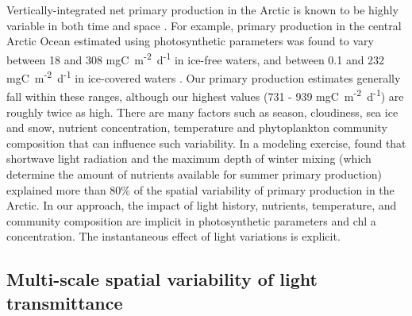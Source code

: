 \documentclass[draft]{agujournal2018}
\newcommand{\dailypp}{mgC~m\textsuperscript{-2}~d\textsuperscript{-1}}
\begin{document}
Vertically-integrated net primary production in the Arctic is known to be highly variable in both time and space \citep{Matrai2013, Hill2018a}. For example, primary production in the central Arctic Ocean estimated using photosynthetic parameters was found to vary between 18 and 308 \dailypp{} in ice-free waters, and between 0.1 and 232 \dailypp{} in ice-covered waters \citep{Fernandez-Mendez2015}. Our primary production estimates generally fall within these ranges, although our highest values (731 - 939 \dailypp{}) are roughly twice as high. There are many factors such as season, cloudiness, sea ice and snow, nutrient concentration, temperature and phytoplankton community composition that can influence such variability. In a modeling exercise, \citet{Popova2010} found that shortwave light radiation and the maximum depth of winter mixing (which determine the amount of nutrients available for summer primary production) explained more than 80\% of the spatial variability of primary production in the Arctic. In our approach, the impact of light history, nutrients, temperature, and community composition are implicit in photosynthetic parameters and chl a concentration. The instantaneous effect of light variations is explicit. 

\subsection{Multi-scale spatial variability of light transmittance}
\end{document}
